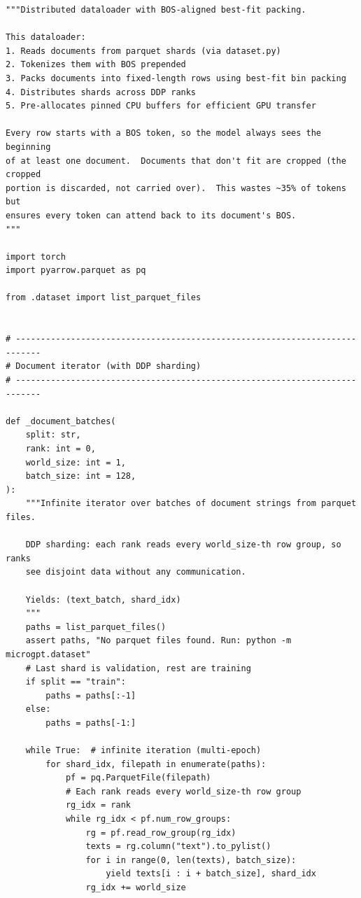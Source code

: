 \begin{lstlisting}
"""Distributed dataloader with BOS-aligned best-fit packing.

This dataloader:
1. Reads documents from parquet shards (via dataset.py)
2. Tokenizes them with BOS prepended
3. Packs documents into fixed-length rows using best-fit bin packing
4. Distributes shards across DDP ranks
5. Pre-allocates pinned CPU buffers for efficient GPU transfer

Every row starts with a BOS token, so the model always sees the beginning
of at least one document.  Documents that don't fit are cropped (the cropped
portion is discarded, not carried over).  This wastes ~35% of tokens but
ensures every token can attend back to its document's BOS.
"""

import torch
import pyarrow.parquet as pq

from .dataset import list_parquet_files


# ---------------------------------------------------------------------------
# Document iterator (with DDP sharding)
# ---------------------------------------------------------------------------

def _document_batches(
    split: str,
    rank: int = 0,
    world_size: int = 1,
    batch_size: int = 128,
):
    """Infinite iterator over batches of document strings from parquet files.

    DDP sharding: each rank reads every world_size-th row group, so ranks
    see disjoint data without any communication.

    Yields: (text_batch, shard_idx)
    """
    paths = list_parquet_files()
    assert paths, "No parquet files found. Run: python -m microgpt.dataset"
    # Last shard is validation, rest are training
    if split == "train":
        paths = paths[:-1]
    else:
        paths = paths[-1:]

    while True:  # infinite iteration (multi-epoch)
        for shard_idx, filepath in enumerate(paths):
            pf = pq.ParquetFile(filepath)
            # Each rank reads every world_size-th row group
            rg_idx = rank
            while rg_idx < pf.num_row_groups:
                rg = pf.read_row_group(rg_idx)
                texts = rg.column("text").to_pylist()
                for i in range(0, len(texts), batch_size):
                    yield texts[i : i + batch_size], shard_idx
                rg_idx += world_size
\end{lstlisting}

